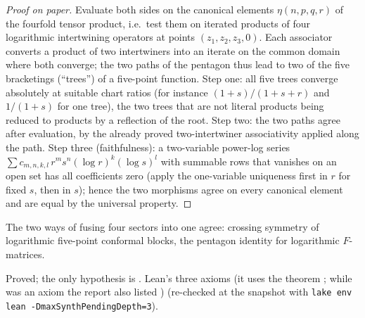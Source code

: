 \begin{proof}[Proof on paper]
Evaluate both sides on the canonical elements $\eta(n,p,q,r)$ of the fourfold tensor product, i.e.\ test them on iterated
products of four logarithmic intertwining operators at points $(z_1,z_2,z_3,0)$. Each associator converts a product of
two intertwiners into an iterate on the common domain where both converge; the two paths of the pentagon thus lead to
two of the five bracketings (``trees'') of a five-point function. Step one: all five trees converge absolutely at
suitable chart ratios (for instance $(1+s)/(1+s+r)$ and $1/(1+s)$ for one tree), the two trees that are not literal
products being reduced to products by a reflection of the root. Step two: the two paths agree after evaluation, by
the already proved two-intertwiner associativity applied along the path. Step three (faithfulness): a two-variable
power-log series $\sum c_{m,n,k,l}\,r^{m}s^{n}(\log r)^k(\log s)^l$ with summable rows that vanishes on an open set has
all coefficients zero (apply the one-variable uniqueness first in $r$ for fixed $s$, then in $s$); hence the two
morphisms agree on every canonical element and are equal by the universal property.
\end{proof}

\begin{physics}
The two ways of fusing four sectors into one agree: crossing symmetry of logarithmic five-point conformal blocks, the
pentagon identity for logarithmic $F$-matrices.
\end{physics}

\begin{status}
Proved; the only hypothesis is . Lean's three axioms (it uses the theorem ; while  was an axiom the report also listed ) (re-checked at the snapshot with
\texttt{lake env lean -DmaxSynthPendingDepth=3}).
\end{status}

